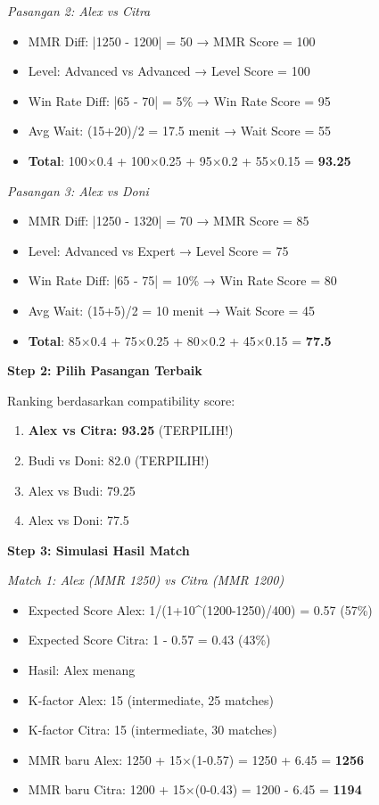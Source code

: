 \documentclass[12pt]{article}
\begin{document}
\textit{Pasangan 2: Alex vs Citra}
\begin{itemize}
    \item MMR Diff: |1250 - 1200| = 50 → MMR Score = 100
    \item Level: Advanced vs Advanced → Level Score = 100
    \item Win Rate Diff: |65 - 70| = 5\% → Win Rate Score = 95
    \item Avg Wait: (15+20)/2 = 17.5 menit → Wait Score = 55
    \item \textbf{Total}: 100×0.4 + 100×0.25 + 95×0.2 + 55×0.15 = \textbf{93.25}
\end{itemize}

\textit{Pasangan 3: Alex vs Doni}
\begin{itemize}
    \item MMR Diff: |1250 - 1320| = 70 → MMR Score = 85
    \item Level: Advanced vs Expert → Level Score = 75
    \item Win Rate Diff: |65 - 75| = 10\% → Win Rate Score = 80
    \item Avg Wait: (15+5)/2 = 10 menit → Wait Score = 45
    \item \textbf{Total}: 85×0.4 + 75×0.25 + 80×0.2 + 45×0.15 = \textbf{77.5}
\end{itemize}

\textbf{Step 2: Pilih Pasangan Terbaik}

Ranking berdasarkan compatibility score:
\begin{enumerate}
    \item \textbf{Alex vs Citra: 93.25} (TERPILIH!)
    \item Budi vs Doni: 82.0 (TERPILIH!)
    \item Alex vs Budi: 79.25
    \item Alex vs Doni: 77.5
\end{enumerate}

\textbf{Step 3: Simulasi Hasil Match}

\textit{Match 1: Alex (MMR 1250) vs Citra (MMR 1200)}
\begin{itemize}
    \item Expected Score Alex: 1/(1+10^{(1200-1250)/400}) = 0.57 (57\%)
    \item Expected Score Citra: 1 - 0.57 = 0.43 (43\%)
    \item Hasil: Alex menang
    \item K-factor Alex: 15 (intermediate, 25 matches)
    \item K-factor Citra: 15 (intermediate, 30 matches)
    \item MMR baru Alex: 1250 + 15×(1-0.57) = 1250 + 6.45 = \textbf{1256}
    \item MMR baru Citra: 1200 + 15×(0-0.43) = 1200 - 6.45 = \textbf{1194}
\end{itemize}
\end{document}
